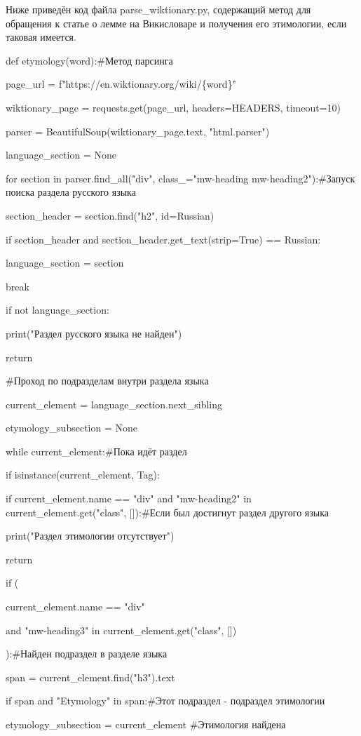 Ниже приведён код файла parse\_wiktionary.py, содержащий метод для обращения к статье о лемме на Викисловаре и получения его этимологии, если таковая имеется.

def etymology(word):\#Метод парсинга

page\_url = f"https://en.wiktionary.org/wiki/\{word\}"

wiktionary\_page = requests.get(page\_url, headers=HEADERS, timeout=10)

parser = BeautifulSoup(wiktionary\_page.text, "html.parser")

language\_section = None

for section in parser.find\_all("div", class\_="mw-heading mw-heading2"):\#Запуск поиска раздела русского языка

section\_header = section.find("h2", id=\textquotesingle Russian\textquotesingle)

if section\_header and section\_header.get\_text(strip=True) == \textquotesingle Russian\textquotesingle:

language\_section = section

break

if not language\_section:

print("Раздел русского языка не найден")

return

\#Проход по подразделам внутри раздела языка

current\_element = language\_section.next\_sibling

etymology\_subsection = None

while current\_element:\#Пока идёт раздел

if isinstance(current\_element, Tag):

if current\_element.name == "div" and "mw-heading2" in current\_element.get("class", {[}{]}):\#Если был достигнут раздел другого языка

print("Раздел этимологии отсутствует")

return

if (

current\_element.name == "div"

and "mw-heading3" in current\_element.get("class", {[}{]})

):\#Найден подраздел в разделе языка

span = current\_element.find("h3").text

if span and "Etymology" in span:\#Этот подраздел - подраздел этимологии

etymology\_subsection = current\_element \#Этимология найдена

